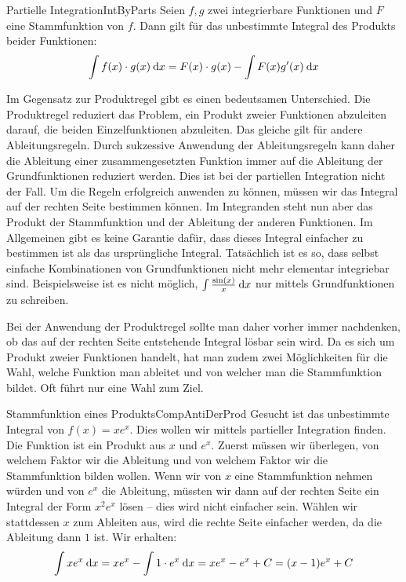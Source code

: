 \begin{definition}{Partielle Integration}{IntByParts}
    Seien $f,g$ zwei integrierbare Funktionen und $F$ eine Stammfunktion von $f$. Dann gilt für das unbestimmte Integral des Produkts beider Funktionen:
    $$
      \int f(x) \cdot g(x) \:\mathrm{d}{x} = F(x) \cdot g(x) - \int F(x) g'(x) \:\mathrm{d}{x}
    $$
\end{definition}

Im Gegensatz zur Produktregel gibt es einen bedeutsamen Unterschied. Die Produktregel reduziert das Problem, ein Produkt zweier Funktionen abzuleiten darauf, die beiden Einzelfunktionen abzuleiten. Das gleiche gilt für andere Ableitungsregeln. Durch sukzessive Anwendung der Ableitungsregeln kann daher die Ableitung einer zusammengesetzten Funktion immer auf die Ableitung der Grundfunktionen reduziert werden. Dies ist bei der partiellen Integration nicht der Fall. Um die Regeln erfolgreich anwenden zu können, müssen wir das Integral auf der rechten Seite bestimmen können. Im Integranden steht nun aber das Produkt der Stammfunktion und der Ableitung der anderen Funktionen. Im Allgemeinen gibt es keine Garantie dafür, dass dieses Integral einfacher zu bestimmen ist als das ursprüngliche Integral. Tatsächlich ist es so, dass selbst einfache Kombinationen von Grundfunktionen nicht mehr elementar integriebar sind. Beispielsweise ist es nicht möglich, $\int \frac{\sin(x)}{x} \:\mathrm{d}{x}$ nur mittels Grundfunktionen zu schreiben.

Bei der Anwendung der Produktregel sollte man daher vorher immer nachdenken, ob das auf der rechten Seite entstehende Integral lösbar sein wird. Da es sich um Produkt zweier Funktionen handelt, hat man zudem zwei Möglichkeiten für die Wahl, welche Funktion man ableitet und von welcher man die Stammfunktion bildet. Oft führt nur eine Wahl zum Ziel.

\begin{example}{Stammfunktion eines Produkts}{CompAntiDerProd}
    Gesucht ist das unbestimmte Integral von $f(x) = x e^x$. Dies wollen wir mittels partieller Integration finden. Die Funktion ist ein Produkt aus $x$ und $e^x$. Zuerst müssen wir überlegen, von welchem Faktor wir die Ableitung und von welchem Faktor wir die Stammfunktion bilden wollen. Wenn wir von $x$ eine Stammfunktion nehmen würden und von $e^x$ die Ableitung, müssten wir dann auf der rechten Seite ein Integral der Form $x^2 e^x$ lösen -- dies wird nicht einfacher sein. Wählen wir stattdessen $x$ zum Ableiten aus, wird die rechte Seite einfacher werden, da die Ableitung dann $1$ ist. Wir erhalten:
    $$
        \int x e^x \:\mathrm{d}{x} = x e^x - \int 1 \cdot e^x \:\mathrm{d}{x} = xe^x-e^x + C = (x-1) e^x + C
    $$
\end{example}

